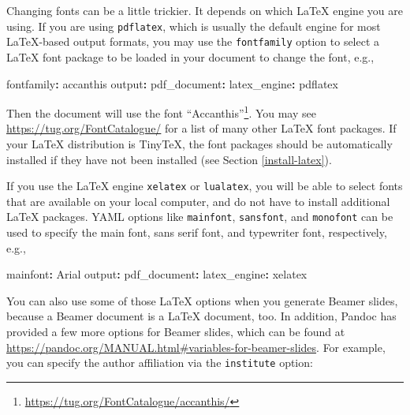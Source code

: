 \documentclass[
  11pt,
]{krantz}
\newenvironment{Shaded}{\begin{snugshade}}{\end{snugshade}}
\newcommand{\AttributeTok}[1]{\textcolor[rgb]{0.61,0.61,0.61}{#1}}
\newcommand{\FunctionTok}[1]{\textcolor[rgb]{0,0,0}{#1}}
\newcommand{\KeywordTok}[1]{\textcolor[rgb]{0.27,0.27,0.27}{\textbf{#1}}}
\renewcommand{\href}[2]{#2\footnote{\url{#1}}}
\begin{document}
Changing fonts can be a little trickier. It depends on which LaTeX engine you are using. If you are using \texttt{pdflatex}, which is usually the default engine for most LaTeX-based output formats, you may use the \texttt{fontfamily} option to select a LaTeX font package to be loaded in your document to change the font, e.g.,

\begin{Shaded}
\begin{Highlighting}[]
\FunctionTok{fontfamily}\KeywordTok{:}\AttributeTok{ accanthis}
\FunctionTok{output}\KeywordTok{:}
\AttributeTok{  }\FunctionTok{pdf_document}\KeywordTok{:}\AttributeTok{ }
\AttributeTok{    }\FunctionTok{latex_engine}\KeywordTok{:}\AttributeTok{ pdflatex}
\end{Highlighting}
\end{Shaded}

Then the document will use the font \href{https://tug.org/FontCatalogue/accanthis/}{``Accanthis''}. You may see \url{https://tug.org/FontCatalogue/} for a list of many other LaTeX font packages. If your LaTeX distribution is TinyTeX, the font packages should be automatically installed if they have not been installed (see Section \ref{install-latex}).

If you use the LaTeX engine \texttt{xelatex} or \texttt{lualatex}, you will be able to select fonts that are available on your local computer, and do not have to install additional LaTeX packages. YAML options like \texttt{mainfont}, \texttt{sansfont}, and \texttt{monofont} can be used to specify the main font, sans serif font, and typewriter font, respectively, e.g.,

\begin{Shaded}
\begin{Highlighting}[]
\FunctionTok{mainfont}\KeywordTok{:}\AttributeTok{ Arial}
\FunctionTok{output}\KeywordTok{:}
\AttributeTok{  }\FunctionTok{pdf_document}\KeywordTok{:}\AttributeTok{ }
\AttributeTok{    }\FunctionTok{latex_engine}\KeywordTok{:}\AttributeTok{ xelatex}
\end{Highlighting}
\end{Shaded}

You can also use some of those LaTeX options when you generate Beamer slides, because a Beamer document is a LaTeX document, too. In addition, Pandoc has provided a few more options for Beamer slides, which can be found at \url{https://pandoc.org/MANUAL.html\#variables-for-beamer-slides}. For example, you can specify the author affiliation via the \texttt{institute} option:
\end{document}
